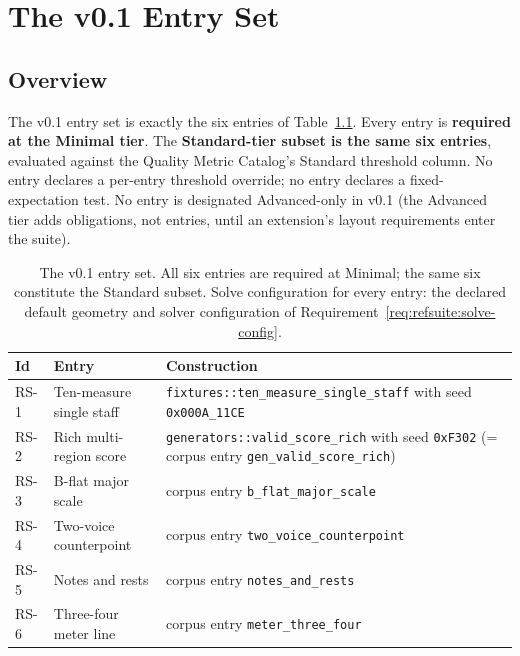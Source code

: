 \documentclass[11pt,letterpaper]{report}
\newcounter{requirement}[chapter]
\begin{document}
\chapter{The v0.1 Entry Set}
\label{ch:entries}

\section{Overview}
\label{sec:entries:overview}

\begin{requirement}
\label{req:refsuite:entries}
The v0.1 entry set is exactly the six entries of
Table~\ref{tab:entries}. Every entry is \textbf{required at the Minimal
tier}. The \textbf{Standard-tier subset is the same six entries},
evaluated against the Quality Metric Catalog's Standard threshold
column. No entry declares a per-entry threshold override; no entry
declares a fixed-expectation test. No entry is designated
Advanced-only in v0.1 (the Advanced tier adds obligations, not
entries, until an extension's layout requirements enter the suite).
\end{requirement}

\begin{table}[h]
\centering
\small
\begin{tabular}{lp{4.2cm}p{6.6cm}}
\toprule
\textbf{Id} & \textbf{Entry} & \textbf{Construction} \\
\midrule
RS-1 & Ten-measure single staff &
  \texttt{fixtures::ten\_measure\_single\_staff} with seed
  \texttt{0x000A\_11CE} \\
RS-2 & Rich multi-region score &
  \texttt{generators::valid\_score\_rich} with seed \texttt{0xF302}
  (= corpus entry \texttt{gen\_valid\_score\_rich}) \\
RS-3 & B-flat major scale &
  corpus entry \texttt{b\_flat\_major\_scale} \\
RS-4 & Two-voice counterpoint &
  corpus entry \texttt{two\_voice\_counterpoint} \\
RS-5 & Notes and rests &
  corpus entry \texttt{notes\_and\_rests} \\
RS-6 & Three-four meter line &
  corpus entry \texttt{meter\_three\_four} \\
\bottomrule
\end{tabular}
\caption{The v0.1 entry set. All six entries are required at Minimal;
the same six constitute the Standard subset. Solve configuration for
every entry: the declared default geometry and solver configuration of
Requirement~\ref{req:refsuite:solve-config}.}
\label{tab:entries}
\end{table}
\end{document}
